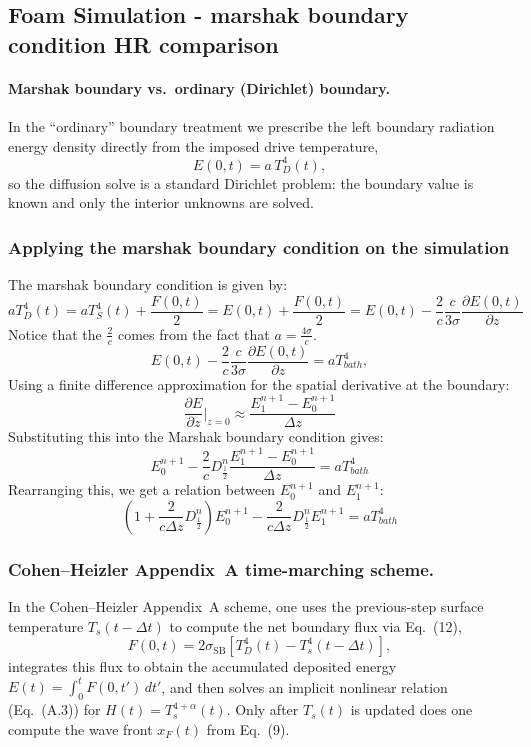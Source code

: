 \documentclass{article}
\begin{document}
\subsection{Foam Simulation - marshak boundary condition HR comparison}
\label{sec:appendixA_energy_step}

\paragraph{Marshak boundary vs.\ ordinary (Dirichlet) boundary.}
In the ``ordinary'' boundary treatment we prescribe the left boundary radiation energy density directly from the imposed drive temperature,
\[
E(0,t)=a\,T_D^4(t),
\]
so the diffusion solve is a standard Dirichlet problem: the boundary value is known and only the interior unknowns are solved.

\subsubsection*{Applying the marshak boundary condition on the simulation}
The marshak boundary condition is given by:
\[
aT_D^4(t)
= aT_S^4(t)+\frac{F(0,t)}{2} = E(0,t)+\frac{F(0,t)}{2} = E(0,t) - \frac{2}{c} \frac{c}{3\sigma} \frac{\partial E(0,t)}{\partial z}
\]
Notice that the $\frac{2}{c}$ comes from the fact that $a = \frac{4\sigma}{c}$.
\begin{equation}
E(0,t)- \frac{2}{c} \frac{c}{3\sigma}\frac{\partial E(0,t)}{\partial z} = aT_{bath}^4,
\end{equation}
Using a finite difference approximation for the spatial derivative at the boundary:
\begin{equation}
\frac{\partial E}{\partial z}|_{z=0} \approx \frac{E_1^{n+1} - E_0^{n+1}}{\Delta z}
\end{equation}
Substituting this into the Marshak boundary condition gives:
\begin{equation}
E_0^{n+1} - \frac{2}{c} D_{\frac{1}{2}}^n\frac{E_1^{n+1} - E_0^{n+1}}{\Delta z} = aT_{bath}^4
\end{equation}
Rearranging this, we get a relation between $E_0^{n+1}$ and $E_1^{n+1}$:
\begin{equation}
\left(1 + \frac{2}{c\Delta z} D_{\frac{1}{2}}^n\right) E_0^{n+1} - \frac{2}{c\Delta z} D_{\frac{1}{2}}^n E_1^{n+1} = aT_{bath}^4
\end{equation}

\subsubsection*{Cohen--Heizler Appendix~A time-marching scheme.}
In the Cohen--Heizler Appendix~A scheme, one uses the previous-step surface temperature \(T_s(t-\Delta t)\) to compute the net boundary flux via Eq.~(12),
\[
F(0,t)=2\sigma_{\mathrm{SB}}\!\left[T_D^4(t)-T_s^4(t-\Delta t)\right],
\]
integrates this flux to obtain the accumulated deposited energy \(E(t)=\int_0^t F(0,t')\,dt'\), and then solves an implicit nonlinear relation (Eq.~(A.3)) for
\(H(t)=T_s^{4+\alpha}(t)\). Only after \(T_s(t)\) is updated does one compute the wave front \(x_F(t)\) from Eq.~(9).
\end{document}

